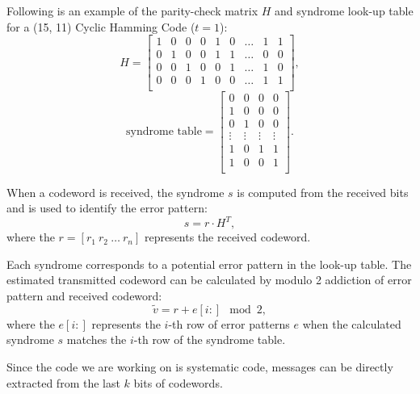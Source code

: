 \documentclass{article}
\begin{document}
Following is an example of the parity-check matrix $H$ and syndrome look-up table for a (15, 11) Cyclic Hamming Code ($t=1$):
\begin{equation*}
H = 
\begin{bmatrix}
1 & 0 & 0 & 0 & 1 & 0 & \dots & 1 & 1 \\
0 & 1 & 0 & 0 & 1 & 1 & \dots & 0 & 0 \\
0 & 0 & 1 & 0 & 0 & 1 & \dots & 1 & 0 \\
0 & 0 & 0 & 1 & 0 & 0 & \dots & 1 & 1 \\
\end{bmatrix} ,
\end{equation*}
\begin{equation}
\text{syndrome table} = 
\begin{bmatrix}
0 & 0 & 0 & 0 \\
1 & 0 & 0 & 0 \\
0 & 1 & 0 & 0 \\
\vdots & \vdots & \vdots & \vdots \\
1 & 0 & 1 & 1 \\
1 & 0 & 0 & 1 \\
\end{bmatrix} .
\end{equation}



When a codeword is received, the syndrome $s$ is computed from the received bits and is used to identify the error pattern:
\begin{equation*}
    s = r \cdot H^T ,
\end{equation*}
where the $r = [r_1\  r_2\  \dots\  r_n ]$ represents the received codeword. 

Each syndrome corresponds to a potential error pattern in the look-up table. The estimated transmitted codeword can be calculated by modulo 2 addiction of error pattern and received codeword:
\begin{equation*}
    \tilde{v} = r + e[i:] \mod 2 ,
\end{equation*}
where the $e[i:]$ represents the $i$-th row of error patterns $e$ when the calculated syndrome $s$ matches the $i$-th row of the syndrome table. 

Since the code we are working on is systematic code, messages can be directly extracted from the last $k$ bits of codewords. 
\end{document}
